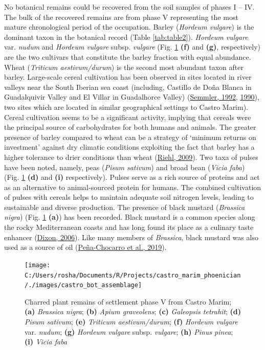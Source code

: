 \documentclass[preprint, 3p, authoryear]{elsarticle} %
\begin{document}
No botanical remains could be recovered from the soil samples of phases I -- IV. The bulk of the recovered remains are from phase V representing the most mature chronological period of the occupation. Barley (\emph{Hordeum vulgare}) is the dominant taxon in the botanical record (Table \ref{tab:table2}). \emph{Hordeum vulgare} var. \emph{nudum} and \emph{Hordeum vulgare} subsp. \emph{vulgare} (Fig. \ref{fig:castro-archbot-assemblage} \textbf{(f)} and \textbf{(g)}, respectively) are the two cultivars that constitute the barley fraction with equal abundance. Wheat (\emph{Triticum aestivum/durum}) is the second most abundant taxon after barley. Large-scale cereal cultivation has been observed in sites located in river valleys near the South Iberian sea coast (including, Castillo de Doña Blanca in Guadalquivir Valley and El Villar in Guadalhorce Valley) (\protect\hyperlink{ref-semmler92}{Semmler, 1992}, \protect\hyperlink{ref-semmler90}{1990}), two sites which are located in similar geographical settings to Castro Marim). Cereal cultivation seems to be a significant activity, implying that cereals were the principal source of carbohydrates for both humans and animals. The greater presence of barley compared to wheat can be a strategy of `minimum returns on investment' against dry climatic conditions exploiting the fact that barley has a higher tolerance to drier conditions than wheat (\protect\hyperlink{ref-riehl09}{Riehl, 2009}). Two taxa of pulses have been noted, namely, peas (\emph{Pisum sativum}) and broad bean (\emph{Vicia faba}) (Fig. \ref{fig:castro-archbot-assemblage} \textbf{(d)} and \textbf{(i)} respectively). Pulses serve as a rich source of proteins and act as an alternative to animal-sourced protein for humans. The combined cultivation of pulses with cereals helps to maintain adequate soil nitrogen levels, leading to sustainable and diverse production. The presence of black mustard (\emph{Brassica nigra}) (Fig. \ref{fig:castro-archbot-assemblage} \textbf{(a)}) has been recorded. Black mustard is a common species along the rocky Mediterranean coasts and has long found its place as a culinary taste enhancer (\protect\hyperlink{ref-dixon06}{Dixon, 2006}). Like many members of \emph{Brassica}, black mustard was also used as a source of oil (\protect\hyperlink{ref-pena-chocarro_etal19}{Peña-Chocarro et al., 2019}).



\begin{figure}
\texttt{[image: C:/Users/rosha/Documents/R/Projects/castro\_marim\_phoenician/./images/castro\_bot\_assemblage]} \caption{Charred plant remains of settlement phase V from Castro Marim; \textbf{(a)} \emph{Brassica nigra}; \textbf{(b)} \emph{Apium graveolens}; \textbf{(c)} \emph{Galeopsis tetrahit}; \textbf{(d)} \emph{Pisum sativum}; \textbf{(e)} \emph{Triticum aestivum/durum}; \textbf{(f)} \emph{Hordeum vulgare} var. \emph{nudum}; \textbf{(g)} \emph{Hordeum vulgare} subsp. \emph{vulgare}; \textbf{(h)} \emph{Pinus pinea}; \textbf{(i)} \emph{Vicia faba}}\label{fig:castro-archbot-assemblage}
\end{figure}
\end{document}

